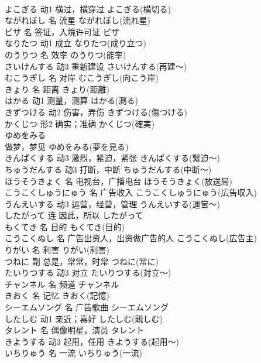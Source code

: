 \documentclass[8pt]{extreport}
\begin{document}
\begin{CJK}{UTF8}{min}
\\	よこぎる	动1	横过，横穿过	よこぎる(横切る)	
\\	ながれぼし	名	流星	ながれぼし(流れ星)	
\\	ビザ	名	签证，入境许可证	ビザ	
\\	なりたつ	动1	成立	なりたつ(成り立つ)	
\\	のうりつ	名	效率	のうりつ(能率)	
\\	さいけんする	动3	重新建设	さいけんする(再建～)	
\\	むこうぎし	名	对岸	むこうぎし(向こう岸)	
\\	きょり	名	距离	きょり(距離)	
\\	はかる	动1	测量，测算	はかる(測る)	
\\	きずつける	动2	伤害，弄伤	きずつける(傷つける)	
\\	かくじつ	形2	确实；准确	かくじつ(確実)	
\\	ゆめをみる	
\\	做梦，梦见	ゆめをみる(夢を見る)	
\\	きんぱくする	动3	激烈，紧迫，紧张	きんぱくする(緊迫～)	
\\	ちゅうだんする	动3	打断，中断	ちゅうだんする(中断～)	
\\	ほうそうきょく	名	电视台，广播电台	ほうそうきょく(放送局)	
\\	こうこくしゅうにゅう	名	广告收入	こうこくしゅうにゅう(広告収入)	
\\	うんえいする	动3	运营，经营，管理	うんえいする(運営～)	
\\	したがって	连	因此，所以	したがって	
\\	もくてき	名	目的	もくてき(目的)	
\\	こうこくぬし	名	广告出资人，出资做广告的人	こうこくぬし(広告主)	
\\	りがい	名	利害	りがい(利害)	
\\	つねに	副	总是，常常，时常	つねに(常に)	
\\	たいりつする	动3	对立	たいりつする(対立～)	
\\	チャンネル	名	频道	チャンネル	
\\	きおく	名	记忆	きおく(記憶)	
\\	シーエムソング	名	广告歌曲	シーエムソング
\\	したしむ	动1	亲近；喜好	したしむ(親しむ)	
\\	タレント	名	偶像明星，演员	タレント	
\\	きようする	动3	起用，任用	きようする(起用～)	
\\	いちりゅう	名	一流	いちりゅう(一流)	

\end{CJK}
\end{document}
